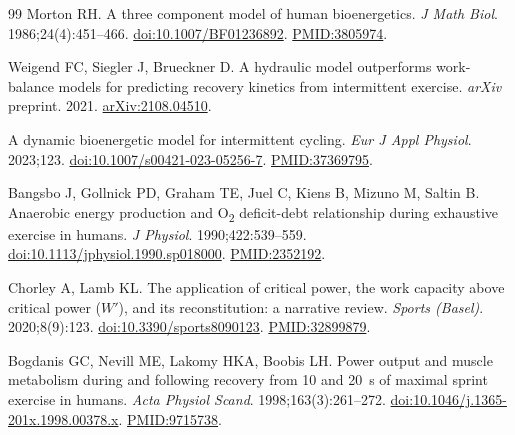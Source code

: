 \documentclass[11pt,a4paper]{article}
\newcommand{\Wp}{\ensuremath{W'}}
\begin{document}
\begin{thebibliography}{99}
 Morton RH. A three component model of human bioenergetics. \emph{J Math Biol}.
1986;24(4):451--466. \href{https://doi.org/10.1007/BF01236892}{doi:10.1007/BF01236892}.
\href{https://pubmed.ncbi.nlm.nih.gov/3805974/}{PMID:3805974}.

 Weigend FC, Siegler J, Brueckner D. A hydraulic model outperforms work-balance models
for predicting recovery kinetics from intermittent exercise. \emph{arXiv} preprint. 2021.
\href{https://arxiv.org/abs/2108.04510}{arXiv:2108.04510}.

 A dynamic bioenergetic model for intermittent cycling. \emph{Eur J Appl Physiol}.
2023;123. \href{https://doi.org/10.1007/s00421-023-05256-7}{doi:10.1007/s00421-023-05256-7}.
\href{https://pubmed.ncbi.nlm.nih.gov/37369795/}{PMID:37369795}.

 Bangsbo J, Gollnick PD, Graham TE, Juel C, Kiens B, Mizuno M, Saltin B. Anaerobic
energy production and O\textsubscript{2} deficit-debt relationship during exhaustive exercise in humans.
\emph{J Physiol}. 1990;422:539--559.
\href{https://doi.org/10.1113/jphysiol.1990.sp018000}{doi:10.1113/jphysiol.1990.sp018000}.
\href{https://pubmed.ncbi.nlm.nih.gov/2352192/}{PMID:2352192}.

 Chorley A, Lamb KL. The application of critical power, the work capacity above
critical power (\Wp), and its reconstitution: a narrative review. \emph{Sports (Basel)}. 2020;8(9):123.
\href{https://doi.org/10.3390/sports8090123}{doi:10.3390/sports8090123}.
\href{https://pubmed.ncbi.nlm.nih.gov/32899879/}{PMID:32899879}.

 Bogdanis GC, Nevill ME, Lakomy HKA, Boobis LH. Power output and muscle metabolism
during and following recovery from 10 and 20~s of maximal sprint exercise in humans. \emph{Acta Physiol
Scand}. 1998;163(3):261--272. \href{https://doi.org/10.1046/j.1365-201x.1998.00378.x}{doi:10.1046/j.1365-201x.1998.00378.x}.
\href{https://pubmed.ncbi.nlm.nih.gov/9715738/}{PMID:9715738}.

\end{thebibliography}
\end{document}
